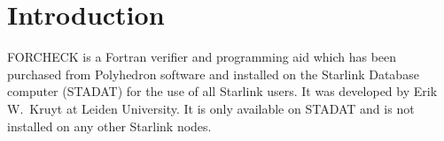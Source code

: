 \documentclass[11pt,twoside]{article}
\newcommand{\stardocinitials}  {SUN}
\newcommand{\stardocnumber}    {73.1}
\newcommand{\stardocname}{\stardocinitials /\stardocnumber}
\newenvironment{latexonly}{}{}
\newcommand{\xlabel}[1]{}
\renewcommand{\thepage}{\roman{page}}
\begin{document}
\newpage
\begin{latexonly}
   \setlength{\parskip}{0mm}
   \tableofcontents
   \setlength{\parskip}{\medskipamount}
   \markright{\stardocname}
\end{latexonly}
\newpage
\renewcommand{\thepage}{\arabic{page}}
\setcounter{page}{1}

\section{Introduction\xlabel{introduction}}

FORCHECK is a Fortran verifier and programming aid which has been purchased
from Polyhedron software and installed on the Starlink Database computer
(STADAT) for the use of all Starlink users.
It was developed by Erik W.\ Kruyt at Leiden University.
It is only available on STADAT and is not installed on any other Starlink
nodes.
\end{document}

